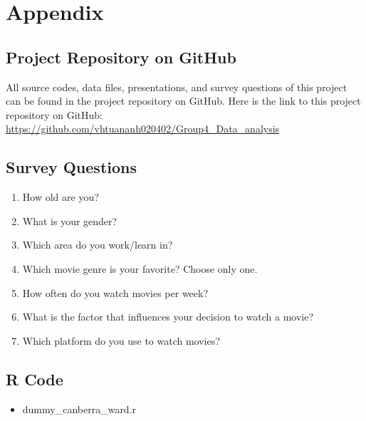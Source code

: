 \section{Appendix}
    \subsection{Project Repository on GitHub}
        All source codes, data files, presentations, and survey questions of this project can be found in the project repository on GitHub. Here is the link to this project repository on GitHub: \url{https://github.com/vhtuananh020402/Group4_Data_analysis}


    \subsection{Survey Questions}
        \begin{enumerate}
            \item How old are you? 
            \item What is your gender?
            \item Which area do you work/learn in?
            \item Which movie genre is your favorite? Choose only one.
            \item How often do you watch movies per week?
            \item What is the factor that influences your decision to watch a movie?
            \item Which platform do you use to watch movies?
        \end{enumerate}

    \subsection{R Code}
        \begin{itemize}
            \item dummy\_canberra\_ward.r
        \end{itemize}

